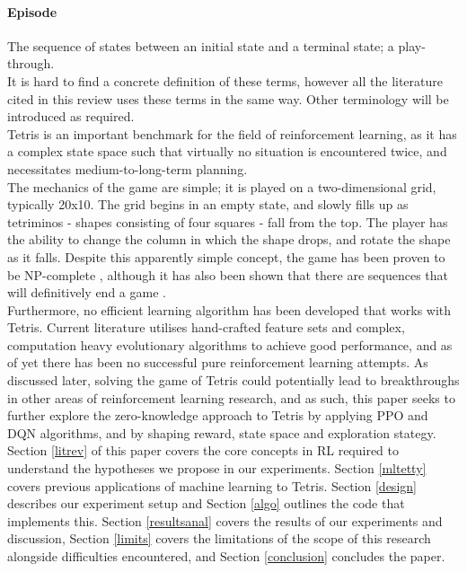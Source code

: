 \documentclass[12pt]{article}
\begin{document}
\paragraph{Episode} The sequence of states between an initial state and a terminal state; a play-through.\\\newline
It is hard to find a concrete definition of these terms, however all the literature cited in this review uses these terms in the same way. Other terminology will be introduced as required. 
\\\newline Tetris is an important benchmark for the field of reinforcement learning, as it has a complex state space such that virtually no situation is encountered twice, and necessitates medium-to-long-term planning. \\\newline
The mechanics of the game are simple; it is played on a two-dimensional grid, typically 20x10. The grid begins in an empty state, and slowly fills up as tetriminos - shapes consisting of four squares - fall from the top. The player has the ability to change the column in which the shape drops, and rotate the shape as it falls. Despite this apparently simple concept, the game has been proven to be NP-complete \autocite{demaine2003tetris}, although it has also been shown that there are sequences that will definitively end a game \autocite{burgiel1997lose}. \\\newline
Furthermore, no efficient learning algorithm has been developed that works with Tetris. Current literature utilises hand-crafted feature sets and complex, computation heavy evolutionary algorithms to achieve good performance, and as of yet there has been no successful pure reinforcement learning attempts. As discussed later, solving the game of Tetris could potentially lead to breakthroughs in other areas of reinforcement learning research, and as such, this paper seeks to further explore the zero-knowledge approach to Tetris by applying PPO and DQN algorithms, and by shaping reward, state space and exploration stategy.  \\\newline
Section \ref{litrev} of this paper covers the core concepts in RL required to understand the hypotheses we propose in our experiments. Section \ref{mltetty} covers previous applications of machine learning to Tetris. Section \ref{design} describes our experiment setup and Section \ref{algo} outlines the code that implements this. Section \ref{resultsanal} covers the results of our experiments and discussion, Section \ref{limits} covers the limitations of the scope of this research alongside difficulties encountered, and Section \ref{conclusion} concludes the paper. 
\newpage
\end{document}
